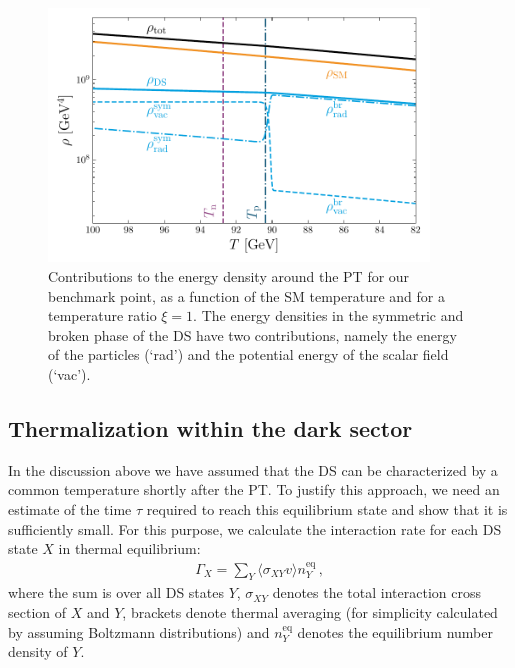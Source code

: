 \begin{figure}[t]
	\centering
	\includegraphics[width=0.9\textwidth]{thesisplots/lisa/thesis_LISA_7}
	\caption{Contributions to the energy density around the \ac{PT} for our benchmark point, as a function of the \ac{SM} temperature and for a temperature ratio $\xi = 1$. The energy densities in the symmetric and broken phase of the \ac{DS} have two contributions, namely the energy of the particles (`rad') and the potential energy of the scalar field (`vac').}
	\label{fig:hubble-parameter}
\end{figure}


\subsection{Thermalization within the dark sector}
\label{sec:thermalization}

In the discussion above we have assumed that the \ac{DS} can be characterized by a common temperature shortly after the \ac{PT}. To justify this approach, we need an estimate of the time $\tau$ required to reach this equilibrium state and show that it is sufficiently
small. For this purpose, we calculate the interaction rate for each \ac{DS} state $X$ in thermal equilibrium:
\begin{align}
	\Gamma_X = \sum_Y \langle \sigma_{XY} v \rangle n_Y^\mathrm{eq} \,,
\end{align}
where the sum is over all \ac{DS} states $Y$, $\sigma_{XY}$ denotes the total interaction cross section of $X$ and $Y$, brackets denote thermal averaging (for simplicity calculated by assuming Boltzmann distributions) and $n_Y^\mathrm{eq}$ denotes the equilibrium number density of $Y$. 

